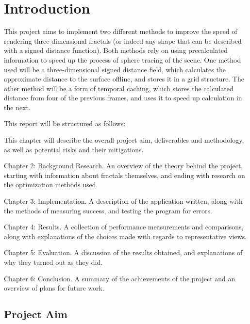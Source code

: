\chapter{Introduction}
\label{chapter1}

This project aims to implement two different methods to improve the speed of rendering three-dimensional fractals (or indeed any shape that can be described with a signed distance function). Both methods rely on using precalculated information to speed up the process of sphere tracing of the scene. One method used will be a three-dimensional signed distance field, which calculates the approximate distance to the surface offline, and stores it in a grid structure. The other method will be a form of temporal caching, which stores the calculated distance from four of the previous frames, and uses it to speed up calculation in the next.\newline

This report will be structured as follows:\newline

This chapter will describe the overall project aim, deliverables and methodology, as well as potential risks and their mitigations.\newline

Chapter 2: Background Research. An overview of the theory behind the project, starting with information about fractals themselves, and ending with research on the optimization methods used.\newline

Chapter 3: Implementation. A description of the application written, along with the methods of measuring success, and testing the program for errors.\newline

Chapter 4: Results. A collection of performance measurements and comparisons, along with explanations of the choices made with regards to representative views.\newline

Chapter 5: Evaluation. A discussion of the results obtained, and explanations of why they turned out as they did.\newline

Chapter 6: Conclusion. A summary of the achievements of the project and an overview of plans for future work.

\section{Project Aim}

